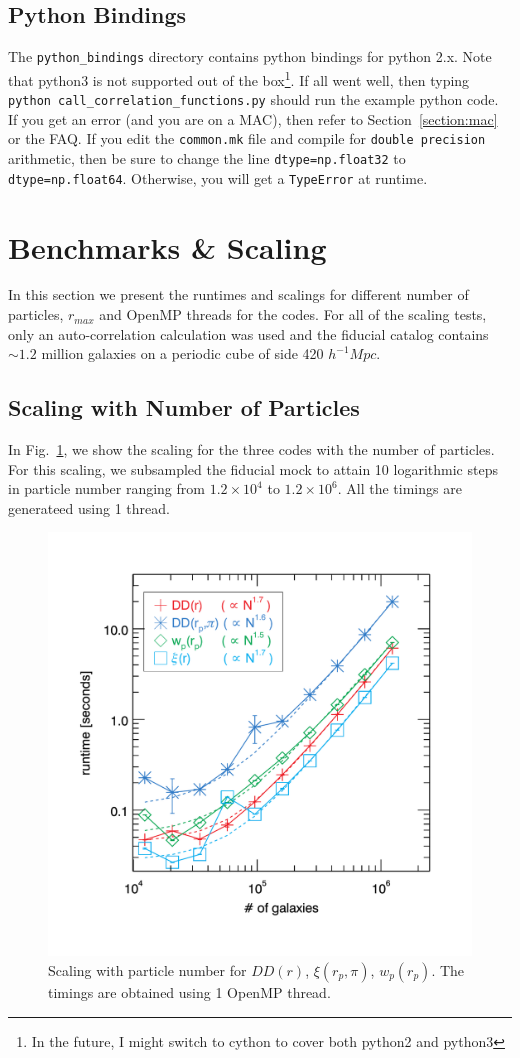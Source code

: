 \documentclass[12pt,titlepage]{article}
\let\stdsection\section
\newcommand{\rmax}{\ensuremath{{r_{max}}}\xspace}
\newcommand{\xir}{\ensuremath{{DD(r)}}\xspace}
\newcommand{\wprp}{\ensuremath{{w_p(r_p)}}\xspace}
\newcommand{\xirppi}{\ensuremath{{\xi(r_p,\pi)}}\xspace}
\newcommand{\hMpc}{\ensuremath{{h^{-1}Mpc}}\xspace}
\begin{document}
\subsection{Python Bindings}
The \texttt{python\_bindings} directory contains python bindings for python 2.x. Note that python3 is not supported out of the box\footnote{In the future, I might switch to 
cython to cover both python2 and python3}. If all went well, then typing \texttt{python call\_correlation\_functions.py} should run the example python code. If you get 
an error (and you are on a MAC), then refer to Section~\ref{section:mac} or the FAQ. 
If you edit the \texttt{common.mk} file and compile for \texttt{double precision} arithmetic, then be sure to change the line \texttt{dtype=np.float32} to 
\texttt{dtype=np.float64}. Otherwise, you will get a \texttt{TypeError} at runtime. 

\stdsection{Benchmarks \& Scaling}
In this section we present the runtimes and scalings for different number of particles, \rmax and OpenMP threads for the codes. 
For all of the scaling tests, only an auto-correlation calculation was used and the fiducial catalog contains $\sim 1.2$ million 
galaxies on a periodic cube of side 420 \hMpc. 

\subsection{Scaling with Number of Particles}
In Fig.~\ref{fig:scaling_numpart}, we show the scaling for the three codes with the number of particles. For this scaling, we subsampled 
the fiducial mock to attain 10 logarithmic steps in particle number ranging from $1.2\times10^4$ to $1.2\times10^6$. All the timings are 
generateed using 1 thread. 
\begin{figure}[htbp]
\includegraphics[clip=true,width=\linewidth]{timings_Mr19_numpart}%
\caption{Scaling with particle number for \xir, \xirppi, \wprp. The timings are obtained 
using 1 OpenMP thread. }
\label{fig:scaling_numpart}
\end{figure}
\end{document}
